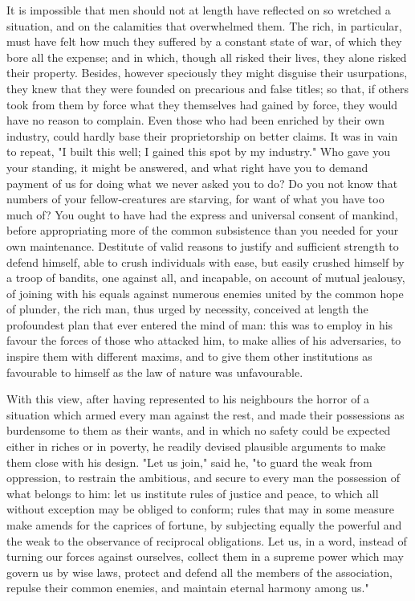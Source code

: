 \documentclass[12pt]{report}
\begin{document}
It is impossible that men should not at length have reflected on so wretched a situation, and on the calamities that overwhelmed them. The rich, in particular, must have felt how much they suffered by a constant state of war, of which they bore all the expense; and in which, though all risked their lives, they alone risked their property. Besides, however speciously they might disguise their usurpations, they knew that they were founded on precarious and false titles; so that, if others took from them by force what they themselves had gained by force, they would have no reason to complain. Even those who had been enriched by their own industry, could hardly base their proprietorship on better claims. It was in vain to repeat, "I built this well; I gained this spot by my industry." Who gave you your standing, it might be answered, and what right have you to demand payment of us for doing what we never asked you to do? Do you not know that numbers of your fellow-creatures are starving, for want of what you have too much of? You ought to have had the express and universal consent of mankind, before appropriating more of the common subsistence than you needed for your own maintenance. Destitute of valid reasons to justify and sufficient strength to defend himself, able to crush individuals with ease, but easily crushed himself by a troop of bandits, one against all, and incapable, on account of mutual jealousy, of joining with his equals against numerous enemies united by the common hope of plunder, the rich man, thus urged by necessity, conceived at length the profoundest plan that ever entered the mind of man: this was to employ in his favour the forces of those who attacked him, to make allies of his adversaries, to inspire them with different maxims, and to give them other institutions as favourable to himself as the law of nature was unfavourable.

With this view, after having represented to his neighbours the horror of a situation which armed every man against the rest, and made their possessions as burdensome to them as their wants, and in which no safety could be expected either in riches or in poverty, he readily devised plausible arguments to make them close with his design. "Let us join," said he, "to guard the weak from oppression, to restrain the ambitious, and secure to every man the possession of what belongs to him: let us institute rules of justice and peace, to which all without exception may be obliged to conform; rules that may in some measure make amends for the caprices of fortune, by subjecting equally the powerful and the weak to the observance of reciprocal obligations. Let us, in a word, instead of turning our forces against ourselves, collect them in a supreme power which may govern us by wise laws, protect and defend all the members of the association, repulse their common enemies, and maintain eternal harmony among us."
\end{document}

